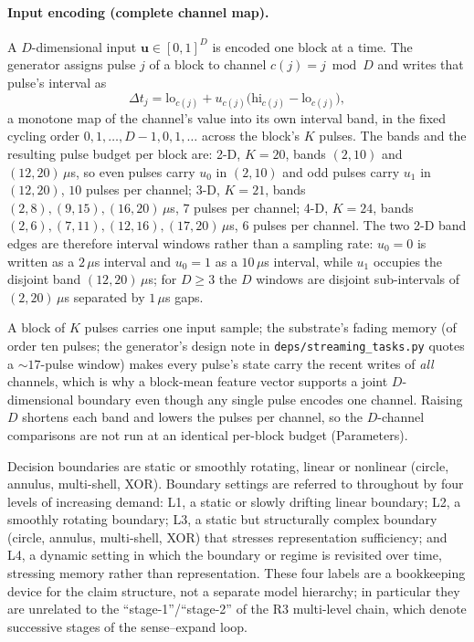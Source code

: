 \documentclass[preprint,12pt]{elsarticle}
\begin{document}
\paragraph{Input encoding (complete channel map).} A $D$-dimensional input
$\mathbf u\in[0,1]^D$ is encoded one block at a time. The generator assigns
pulse $j$ of a block to channel $c(j)=j\bmod D$ and writes that pulse's
interval as
\begin{equation}
\label{eq:encoding}
\Delta t_j=\mathrm{lo}_{c(j)}+u_{c(j)}\big(\mathrm{hi}_{c(j)}
-\mathrm{lo}_{c(j)}\big),
\end{equation}
a monotone map of the channel's value into its own interval band, in the fixed
cycling order $0,1,\dots,D-1,0,1,\dots$ across the block's $K$ pulses. The
bands and the resulting pulse budget per block are: 2-D, $K=20$, bands
$(2,10)$ and $(12,20)\,\mu$s, so even pulses carry $u_0$ in $(2,10)$ and odd
pulses carry $u_1$ in $(12,20)$, $10$ pulses per channel; 3-D, $K=21$, bands
$(2,8),(9,15),(16,20)\,\mu$s, $7$ pulses per channel; 4-D, $K=24$, bands
$(2,6),(7,11),(12,16),(17,20)\,\mu$s, $6$ pulses per channel. The two 2-D
band edges are therefore interval windows rather than a sampling rate:
$u_0=0$ is written as a $2\,\mu$s interval and $u_0=1$ as a $10\,\mu$s
interval, while $u_1$ occupies the disjoint band $(12,20)\,\mu$s; for
$D\geq3$ the $D$ windows are disjoint sub-intervals of $(2,20)\,\mu$s
separated by $1\,\mu$s gaps.

A block of $K$ pulses carries one input sample; the substrate's
fading memory (of order ten pulses; the generator's design note in
\texttt{deps/}\allowbreak\texttt{streaming\_tasks.py} quotes a $\sim17$-pulse window) makes every
pulse's state carry the recent writes of \emph{all} channels, which is why a
block-mean feature vector supports a joint $D$-dimensional boundary even
though any single pulse encodes one channel. Raising $D$ shortens each band
and lowers the pulses per channel, so the $D$-channel comparisons are not run
at an identical per-block budget (Parameters).

Decision
boundaries are static or smoothly rotating, linear or nonlinear (circle,
annulus, multi-shell, XOR). Boundary settings are referred to throughout by
four levels of increasing demand: L1, a static or slowly drifting linear
boundary; L2, a smoothly rotating boundary; L3, a static but structurally
complex boundary (circle, annulus, multi-shell, XOR) that stresses
representation sufficiency; and L4, a dynamic setting in which the boundary
or regime is revisited over time, stressing memory rather than
representation. These four labels are a bookkeeping device for the claim
structure, not a separate model hierarchy; in particular they are unrelated
to the ``stage-1''/``stage-2'' of the R3 multi-level chain, which denote
successive stages of the sense--expand loop.
\end{document}
